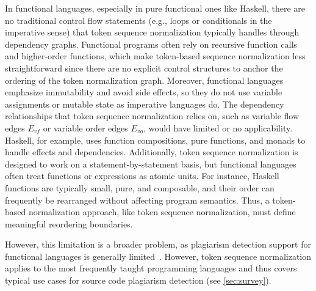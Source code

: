 In functional languages, especially in pure functional ones like Haskell, there are no traditional control flow statements (e.g., loops or conditionals in the imperative sense) that token sequence normalization typically handles through dependency graphs. Functional programs often rely on recursive function calls and higher-order functions, which make token-based sequence normalization less straightforward since there are no explicit control structures to anchor the ordering of the token normalization graph.
%
Moreover, functional languages emphasize immutability and avoid side effects, so they do not use variable assignments or mutable state as imperative languages do. The dependency relationships that token sequence normalization relies on, such as variable flow edges $E_{vf}$ or variable order edges $E_{vo}$, would have limited or no applicability. Haskell, for example, uses function compositions, pure functions, and monads to handle effects and dependencies.
%
Additionally, token sequence normalization is designed to work on a statement-by-statement basis, but functional languages often treat functions or expressions as atomic units. For instance, Haskell functions are typically small, pure, and composable, and their order can frequently be rearranged without affecting program semantics. Thus, a token-based normalization approach, like token sequence normalization, must define meaningful reordering boundaries.

However, this limitation is a broader problem, as plagiarism detection support for functional languages is generally limited~\cite{Hage2013}. However, token sequence normalization applies to the most frequently taught programming languages and thus covers typical use cases for source code plagiarism detection (see \autoref{sec:survey}).

\endinput %

